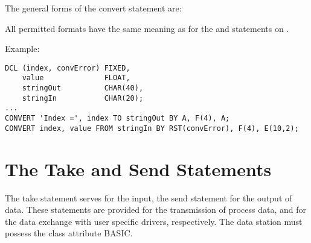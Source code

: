The general forms of the convert statement are:

\begin{grammarframe}





\end{grammarframe}

All permitted formats have the same meaning as for the  and 
statements 
on  .

Example:

\begin{lstlisting}
DCL (index, convError) FIXED,
    value              FLOAT,
    stringOut          CHAR(40),
    stringIn           CHAR(20);
...
CONVERT 'Index =', index TO stringOut BY A, F(4), A;
CONVERT index, value FROM stringIn BY RST(convError), F(4), E(10,2);
\end{lstlisting}

\section{The Take and Send Statements}    %
\label{sec_take_send}

The take statement serves for the input, the send statement for the
output of data. These statements are provided for the transmission of
process data, and for the data exchange with user specific drivers,
respectively. The data station must possess the class attribute BASIC.

\begin{grammarframe}



\end{grammarframe}

